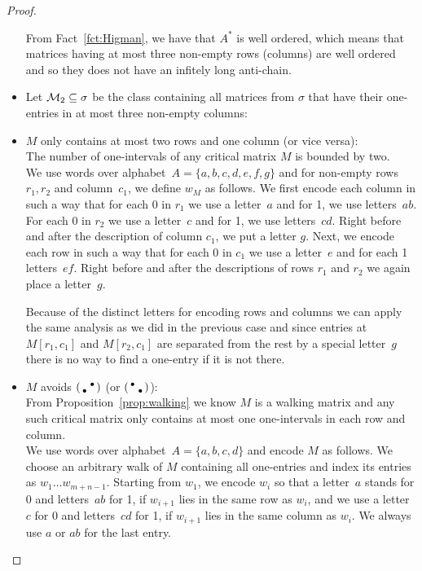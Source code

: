 \begin{proof}
\begin{itemize}
		From Fact~\ref{fct:Higman}, we have that $A^*$ is well ordered, which means that matrices having at most three non-empty rows (columns) are well ordered and so they does not have an infitely long anti-chain.
	\item Let $\mathcal{M}_2\subseteq\sigma$ be the class containing all matrices from $\sigma$ that have their one-entries in at most three non-empty columns:
	\item $M$ only contains at most two rows and one column (or vice versa):\\
		The number of one-intervals of any critical matrix $M$ is bounded by two.\\
		
		We use words over alphabet~$A=\{a,b,c,d,e,f,g\}$ and for non-empty rows~$r_1,r_2$ and column~$c_1$, we define $w_M$ as follows. We first encode each column in such a way that for each 0 in $r_1$ we use a letter~$a$ and for 1, we use letters~$ab$. For each 0 in $r_2$ we use a letter~$c$ and for 1, we use letters~$cd$. Right before and after the description of column $c_1$, we put a letter $g$. Next, we encode each row in such a way that for each 0 in $c_1$ we use a letter~$e$ and for each 1 letters~$ef$. Right before and after the descriptions of rows $r_1$ and $r_2$ we again place a letter~$g$.
		
		Because of the distinct letters for encoding rows and columns we can apply the same analysis as we did in the previous case and since entries at $M[r_1,c_1]$ and $M[r_2,c_1]$ are separated from the rest by a special letter~$g$ there is no way to find a one-entry if it is not there.
	\item $M$ avoids $\left(\begin{smallmatrix} &\bullet\\\bullet& \end{smallmatrix}\right)$ (or $\left(\begin{smallmatrix}\bullet& \\ &\bullet\end{smallmatrix}\right)$):\\
		From Proposition~\ref{prop:walking} we know $M$ is a walking matrix and any such critical matrix only contains at most one one-intervals in each row and column.\\
		
		We use words over alphabet~$A=\{a,b,c,d\}$ and encode $M$ as follows. We choose an arbitrary walk of $M$ containing all one-entries and index its entries as $w_1\dots w_{m+n-1}$. Starting from $w_1$, we encode $w_i$ so that a letter~$a$ stands for 0 and letters~$ab$ for 1, if $w_{i+1}$ lies in the same row as $w_i$, and we use a letter~$c$ for 0 and letters~$cd$ for 1, if $w_{i+1}$ lies in the same column as $w_i$. We always use $a$ or $ab$ for the last entry.
\end{itemize}


\end{proof}
